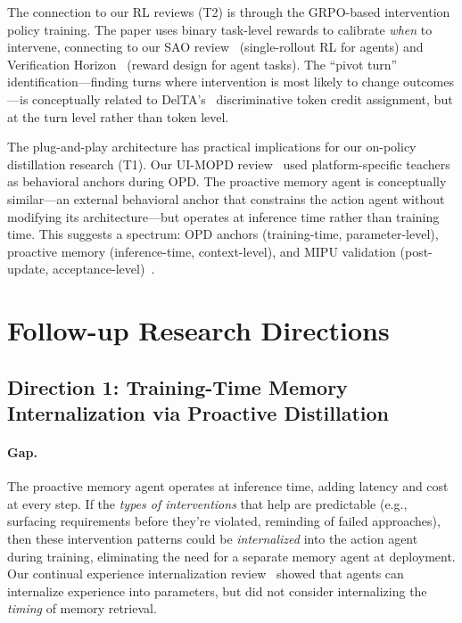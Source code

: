 \documentclass[11pt,a4paper]{article}
\begin{document}
The connection to our RL reviews (T2) is through the GRPO-based intervention policy training. The paper uses binary task-level rewards to calibrate \emph{when} to intervene, connecting to our SAO review~\cite{sao2026} (single-rollout RL for agents) and Verification Horizon~\cite{verificationhorizon2026} (reward design for agent tasks). The ``pivot turn'' identification---finding turns where intervention is most likely to change outcomes---is conceptually related to DelTA's~\cite{delta2026} discriminative token credit assignment, but at the turn level rather than token level.

The plug-and-play architecture has practical implications for our on-policy distillation research (T1). Our UI-MOPD review~\cite{uimopd2026} used platform-specific teachers as behavioral anchors during OPD. The proactive memory agent is conceptually similar---an external behavioral anchor that constrains the action agent without modifying its architecture---but operates at inference time rather than training time. This suggests a spectrum: OPD anchors (training-time, parameter-level), proactive memory (inference-time, context-level), and MIPU validation (post-update, acceptance-level)~\cite{mirage2026}.

\section{Follow-up Research Directions}

\subsection{Direction 1: Training-Time Memory Internalization via Proactive Distillation}

\paragraph{Gap.} The proactive memory agent operates at inference time, adding latency and cost at every step. If the \emph{types of interventions} that help are predictable (e.g., surfacing requirements before they're violated, reminding of failed approaches), then these intervention patterns could be \emph{internalized} into the action agent during training, eliminating the need for a separate memory agent at deployment. Our continual experience internalization review~\cite{rethinking2026} showed that agents can internalize experience into parameters, but did not consider internalizing the \emph{timing} of memory retrieval.
\end{document}
